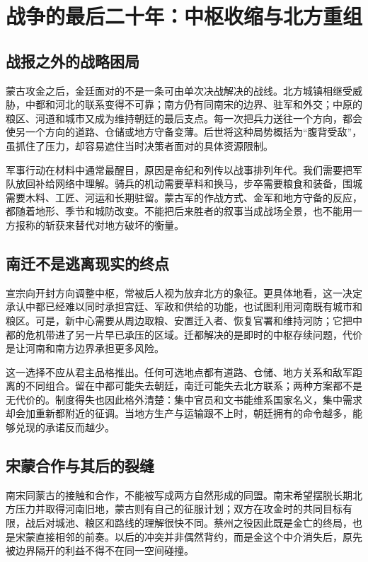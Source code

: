 \section{战争的最后二十年：中枢收缩与北方重组}

\subsection{战报之外的战略困局}

蒙古攻金之后，金廷面对的不是一条可由单次决战解决的战线。北方城镇相继受威胁，中都和河北的联系变得不可靠；南方仍有同南宋的边界、驻军和外交；中原的粮区、河道和城市又成为维持朝廷的最后支点。每一次把兵力送往一个方向，都会使另一个方向的道路、仓储或地方守备变薄。后世将这种局势概括为“腹背受敌”，虽抓住了压力，却容易遮住当时决策者面对的具体资源限制。

军事行动在材料中通常最醒目，原因是帝纪和列传以战事排列年代。我们需要把军队放回补给网络中理解。骑兵的机动需要草料和换马，步卒需要粮食和装备，围城需要木料、工匠、河运和长期驻留。蒙古军的作战方式、金军和地方守备的反应，都随着地形、季节和城防改变。不能把后来胜者的叙事当成战场全景，也不能用一方报称的斩获来替代对地方破坏的衡量。

\subsection{南迁不是逃离现实的终点}

宣宗向开封方向调整中枢，常被后人视为放弃北方的象征。更具体地看，这一决定承认中都已经难以同时承担宫廷、军政和供给的功能，也试图利用河南既有城市和粮区。可是，新中心需要从周边取粮、安置迁入者、恢复官署和维持河防；它把中都的危机带进了另一片早已承压的区域。迁都解决的是即时的中枢存续问题，代价是让河南和南方边界承担更多风险。

这一选择不应从君主品格推出。任何可选地点都有道路、仓储、地方关系和敌军距离的不同组合。留在中都可能失去朝廷，南迁可能失去北方联系；两种方案都不是无代价的。制度得失也因此格外清楚：集中官员和文书能维系国家名义，集中需求却会加重新都附近的征调。当地方生产与运输跟不上时，朝廷拥有的命令越多，能够兑现的承诺反而越少。

\subsection{宋蒙合作与其后的裂缝}

南宋同蒙古的接触和合作，不能被写成两方自然形成的同盟。南宋希望摆脱长期北方压力并取得河南旧地，蒙古则有自己的征服计划；双方在攻金时的共同目标有限，战后对城池、粮区和路线的理解很快不同。蔡州之役因此既是金亡的终局，也是宋蒙直接相邻的前奏。以后的冲突并非偶然背约，而是金这个中介消失后，原先被边界隔开的利益不得不在同一空间碰撞。

